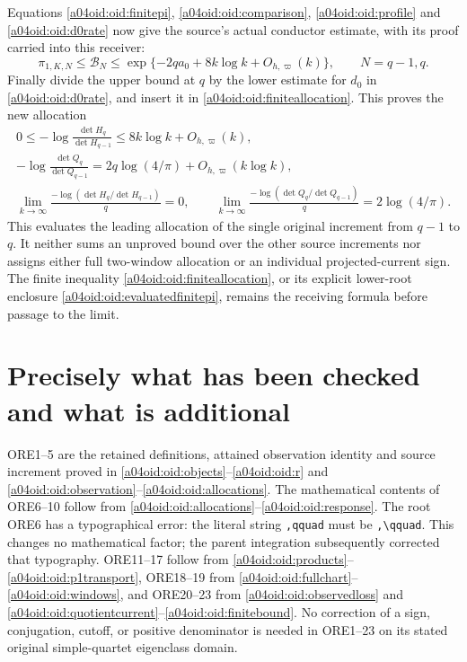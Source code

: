 Equations \eqref{a04oid:oid:finitepi}, \eqref{a04oid:oid:comparison},
\eqref{a04oid:oid:profile} and \eqref{a04oid:oid:d0rate} now give the source's
actual conductor estimate, with its proof carried into this receiver:
\begin{equation}\label{a04oid:oid:pirate}
 \pi_{1,K,N}\le\mathcal B_N
 \le\exp\{-2qa_0+8k\log k+O_{h,\varpi}(k)\},
 \qquad N=q-1,q.
\end{equation}
Finally divide the upper bound at $q$ by the lower estimate for
$d_0$ in \eqref{a04oid:oid:d0rate}, and insert it in
\eqref{a04oid:oid:finiteallocation}. This proves the new allocation
\begin{equation}\label{a04oid:oid:firstallocation}
 \boxed{\begin{gathered}
 0\le-\log\frac{\det H_q}{\det H_{q-1}}
 \le8k\log k+O_{h,\varpi}(k),\\
 -\log\frac{\det Q_q}{\det Q_{q-1}}
 =2q\log(4/\pi)+O_{h,\varpi}(k\log k),\\
 \lim_{k\to\infty}\frac{-\log(\det H_q/\det H_{q-1})}{q}=0,
 \qquad
 \lim_{k\to\infty}\frac{-\log(\det Q_q/\det Q_{q-1})}{q}
 =2\log(4/\pi).
 \end{gathered}}
\end{equation}
This evaluates the leading allocation of the single original
increment from $q-1$ to $q$. It neither sums an unproved bound over
the other source increments nor assigns either full two-window
allocation or an individual projected-current sign. The finite
inequality \eqref{a04oid:oid:finiteallocation}, or its explicit lower-root
enclosure \eqref{a04oid:oid:evaluatedfinitepi}, remains the receiving formula
before passage to the limit.

\section{Precisely what has been checked and what is additional}

ORE1--5 are the retained definitions, attained observation identity
and source increment proved in \eqref{a04oid:oid:objects}--\eqref{a04oid:oid:r}
and \eqref{a04oid:oid:observation}--\eqref{a04oid:oid:allocations}.
The mathematical contents of ORE6--10 follow from
\eqref{a04oid:oid:allocations}--\eqref{a04oid:oid:response}. The root ORE6 has
a typographical error: the literal string \texttt{,qquad} must be
\texttt{,\textbackslash qquad}. This changes no mathematical factor;
the parent integration subsequently corrected that typography.
ORE11--17 follow from \eqref{a04oid:oid:products}--\eqref{a04oid:oid:p1transport},
ORE18--19 from \eqref{a04oid:oid:fullchart}--\eqref{a04oid:oid:windows}, and
ORE20--23 from \eqref{a04oid:oid:observedloss} and
\eqref{a04oid:oid:quotientcurrent}--\eqref{a04oid:oid:finitebound}. No correction
of a sign, conjugation, cutoff, or positive denominator is needed in
ORE1--23 on its stated original simple-quartet eigenclass domain.

